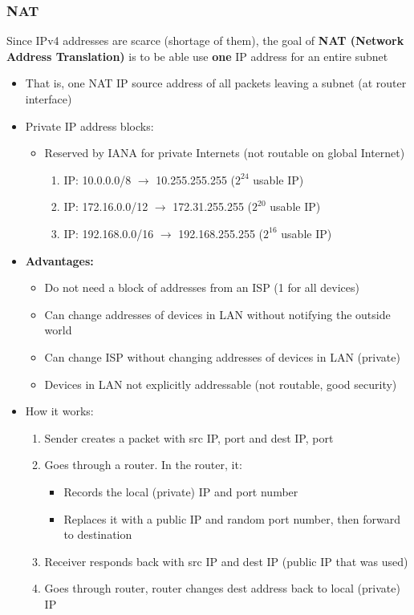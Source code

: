 \documentclass{article}
\begin{document}
\subsubsection{NAT}
Since IPv4 addresses are scarce (shortage of them), the goal of \textbf{NAT (Network Address Translation)}
is to be able use \textbf{one} IP address for an entire subnet
\begin{itemize}
    \item That is, one NAT IP source address of all packets leaving a subnet (at router interface)
    \item Private IP address blocks:
    \begin{itemize}
        \item Reserved by IANA for private Internets (not routable on global Internet)
        \begin{enumerate}
            \item IP: 10.0.0.0/8 $\rightarrow$ 10.255.255.255 ($2^24$ usable IP)
            \item IP: 172.16.0.0/12 $\rightarrow$ 172.31.255.255 ($2^20$ usable IP)
            \item IP: 192.168.0.0/16 $\rightarrow$ 192.168.255.255 ($2^16$ usable IP)
        \end{enumerate}
    \end{itemize}
    \item \textbf{Advantages:}
    \begin{itemize}
        \item Do not need a block of addresses from an ISP (1 for all devices)
        \item Can change addresses of devices in LAN without notifying the outside world
        \item Can change ISP without changing addresses of devices in LAN (private)
        \item Devices in LAN not explicitly addressable (not routable, good security)
    \end{itemize}
    \item How it works:
    \begin{enumerate}
        \item Sender creates a packet with src IP, port and dest IP, port
        \item Goes through a router. In the router, it:
        \begin{itemize}
            \item Records the local (private) IP and port number
            \item Replaces it with a public IP and random port number, then forward to destination
        \end{itemize}
        \item Receiver responds back with src IP and dest IP (public IP that was used) 
        \item Goes through router, router changes dest address back to local (private) IP
    \end{enumerate}
\end{itemize}
\newpage
\end{document}
